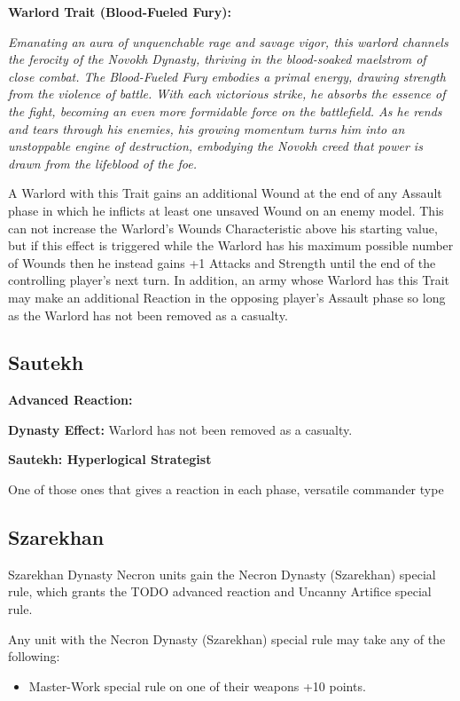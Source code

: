 \begin{multicols}{2}
\textbf{Warlord Trait (Blood-Fueled Fury):}

\textit{Emanating an aura of unquenchable rage and savage vigor, this warlord channels the ferocity of the Novokh Dynasty, thriving in the blood-soaked maelstrom of close combat. The Blood-Fueled Fury embodies a primal energy, drawing strength from the violence of battle. With each victorious strike, he absorbs the essence of the fight, becoming an even more formidable force on the battlefield. As he rends and tears through his enemies, his growing momentum turns him into an unstoppable engine of destruction, embodying the Novokh creed that power is drawn from the lifeblood of the foe.}

A Warlord with this Trait gains an additional Wound at the end of any Assault phase in which he inflicts at least one unsaved Wound on an enemy model. This can not increase the Warlord’s Wounds Characteristic above his starting value, but if this effect is triggered while the Warlord has his maximum possible number of Wounds then he instead gains +1 Attacks and Strength until the end of the controlling player’s next turn. In addition, an army whose Warlord has this Trait may make an additional Reaction in the opposing player’s Assault phase so long as the Warlord has not been removed as a casualty.


\newpage
\subsection{Sautekh}

\textbf{Advanced Reaction:}

\textbf{Dynasty Effect:}
Warlord has not been removed as a casualty.

\textbf{Sautekh: Hyperlogical Strategist}

One of those ones that gives a reaction in each phase, versatile commander type


\newpage
\subsection{Szarekhan}

Szarekhan Dynasty Necron units gain the Necron Dynasty (Szarekhan) special rule, which grants the TODO advanced reaction and Uncanny Artifice special rule.

Any unit with the Necron Dynasty (Szarekhan) special rule may take any of the following:
\begin{itemize}
	\item Master-Work special rule on one of their weapons \dotfill +10 points.
\end{itemize}


\end{multicols}
